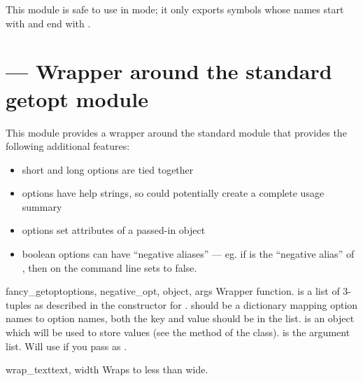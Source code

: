 \documentclass{manual}
\begin{document}
This module is safe to use in  mode; it only exports
symbols whose names start with  and end with .

\section{
         --- Wrapper around the standard getopt module}

This module provides a wrapper around the standard  
module that provides the following additional features:

\begin{itemize}
\item short and long options are tied together
\item options have help strings, so  could potentially 
create a complete usage summary
\item options set attributes of a passed-in object
\item boolean options can have ``negative aliases'' --- eg. if
 is the ``negative alias'' of
, then  on the command
line sets  to false.

\end{itemize}


\begin{funcdesc}{fancy_getopt}{options, negative_opt, object, args}
Wrapper function.  is a list of
 3-tuples as described in the
constructor for .  should be a dictionary
mapping option names to option names, both the key and value should be in the
 list.  is an object which will be used to store
values (see the  method of the  class).
 is the argument list. Will use  if you 
pass  as .
\end{funcdesc}

\begin{funcdesc}{wrap_text}{text, width}
Wraps  to less than  wide.

\end{funcdesc}
\end{document}
